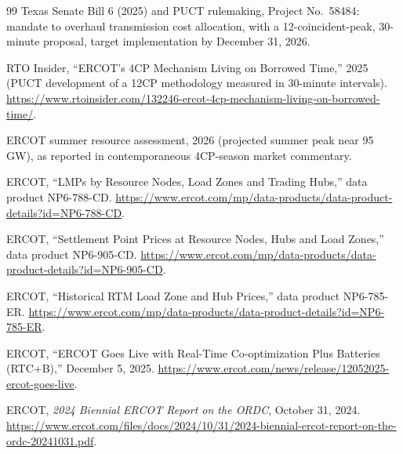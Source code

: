 \documentclass[11pt]{article}
\theoremstyle{remark}
\begin{document}
\begin{thebibliography}{99}
Texas Senate Bill 6 (2025) and PUCT rulemaking, Project No.~58484: mandate to
overhaul transmission cost allocation, with a 12-coincident-peak, 30-minute
proposal, target implementation by December 31, 2026.

RTO Insider, ``ERCOT's 4CP Mechanism Living on Borrowed Time,'' 2025
(PUCT development of a 12CP methodology measured in 30-minute intervals).
\url{https://www.rtoinsider.com/132246-ercot-4cp-mechanism-living-on-borrowed-time/}.

ERCOT summer resource assessment, 2026 (projected summer peak near 95 GW),
as reported in contemporaneous 4CP-season market commentary.

ERCOT, ``LMPs by Resource Nodes, Load Zones and Trading Hubs,''
data product NP6-788-CD.
\url{https://www.ercot.com/mp/data-products/data-product-details?id=NP6-788-CD}.

ERCOT, ``Settlement Point Prices at Resource Nodes, Hubs and Load Zones,''
data product NP6-905-CD.
\url{https://www.ercot.com/mp/data-products/data-product-details?id=NP6-905-CD}.

ERCOT, ``Historical RTM Load Zone and Hub Prices,''
data product NP6-785-ER.
\url{https://www.ercot.com/mp/data-products/data-product-details?id=NP6-785-ER}.

ERCOT, ``ERCOT Goes Live with Real-Time Co-optimization Plus Batteries
(RTC+B),'' December 5, 2025.
\url{https://www.ercot.com/news/release/12052025-ercot-goes-live}.

ERCOT, \emph{2024 Biennial ERCOT Report on the ORDC}, October 31, 2024.
\url{https://www.ercot.com/files/docs/2024/10/31/2024-biennial-ercot-report-on-the-ordc-20241031.pdf}.
\end{thebibliography}
\end{document}
